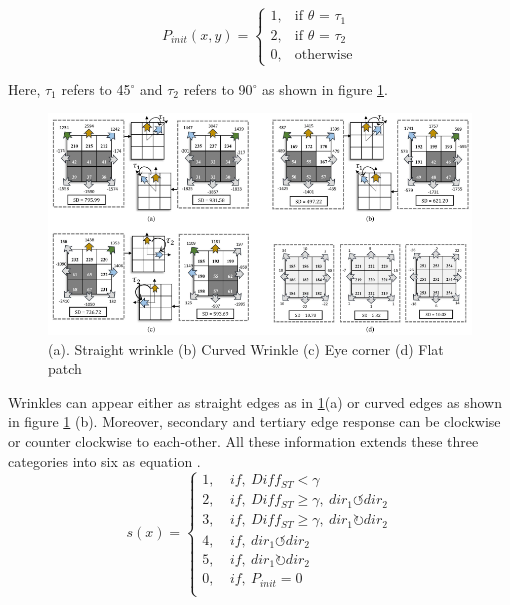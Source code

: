 \documentclass[12pt]{article}
\begin{document}
\begin{equation}
P_{init}(x,y)= 
\begin{cases}
1,& \text{if } \text{$\theta$ = $\tau_1$}\\
2,& \text{if } \text{$\theta$ = $\tau_2$}\\
0,              & \text{otherwise}
\end{cases}
\end{equation}
\vspace*{.7cm}

\noindent Here, $\tau_1$ refers to 45$^\circ$ and $\tau_2$ refers to  90$^\circ$ as shown in figure \ref{fig:dapp_all}.  
\begin{figure}[H]
	\begin{center}
		\centering
		\includegraphics[width=\textwidth]{dapp_all.png}
		\caption{(a). Straight wrinkle (b) Curved Wrinkle (c) Eye corner (d) Flat patch}
		\label{fig:dapp_all}
	\end{center}
\end{figure}
Wrinkles can appear either as straight edges as in \ref{fig:dapp_all}(a) or curved edges as shown in figure \ref{fig:dapp_all} (b). Moreover, secondary and tertiary edge response can be clockwise or counter clockwise to each-other. All these information extends these three categories into six as equation \label{eqn:six}.\\

\begin{equation}
s(x)= 
\begin{cases}
1,&~ if,~ Diff_{ST}< \gamma\\
2,&~ if,~ Diff_{ST}\geq \gamma,~dir_1 \circlearrowleft dir_2\\
3,&~ if,~ Diff_{ST}\geq \gamma,~ dir_1 \circlearrowright dir_2\\
4,&~ if,~ dir_1 \circlearrowleft dir_2\\
5,&~ if,~ dir_1 \circlearrowright dir_2\\
0,&~ if,~ P_{init}=0\\
\end{cases}
\label{eqn:sixtimes}
\end{equation}
\end{document}

